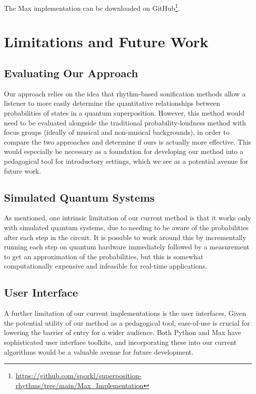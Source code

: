 \documentclass[10pt,twocolumn]{article}
\begin{document}
The Max implementation can be downloaded on GitHub\footnote{\url{https://github.com/sporkl/superposition-rhythms/tree/main/Max_Implementation}}.

\section{Limitations and Future Work}

\subsection{Evaluating Our Approach}

Our approach relies on the idea that rhythm-based sonification methods allow a listener to more easily determine the quantitative relationships between probabilities of states in a quantum superposition. However, this method would need to be evaluated alongside the traditional probability-loudness method with focus groups (ideally of musical and non-musical backgrounds), in order to compare the two approaches and determine if ours is actually more effective. This would especially be necessary as a foundation for developing our method into a pedagogical tool for introductory settings, which we see as a potential avenue for future work.

\subsection{Simulated Quantum Systems}

As mentioned, one intrinsic limitation of our current method is that it works only with simulated quantum systems, due to needing to be aware of the probabilities after each step in the circuit. It is possible to work around this by incrementally running each step on quantum hardware immediately followed by a measurement to get an approximation of the probabilities, but this is somewhat computationally expensive and infeasible for real-time applications\cite{qiskitalgos}.

\subsection{User Interface}

A further limitation of our current implementations is the user interfaces. Given the potential utility of our method as a pedagogical tool, ease-of-use is crucial for lowering the barrier of entry for a wider audience\cite{faghih2014}. Both Python and Max have sophisticated user interface toolkits, and incorporating these into our current algorithms would be a valuable avenue for future development.
\end{document}
